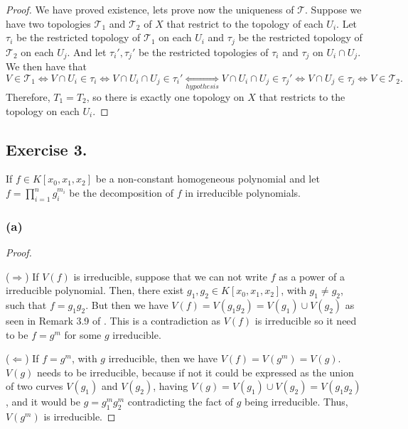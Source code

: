 \documentclass[11pt,a4paper]{article}
\begin{document}
\begin{proof}
  \vspace{1mm}
  We have proved existence, lets prove now the uniqueness of $ \mathcal T $. Suppose we have two topologies $ \mathcal T_1 $ and $ \mathcal T_2 $ of $ X $ that restrict to the topology of each $ U_i $. Let $ \tau_i $ be the restricted topology of $ \mathcal T_1 $ on each $ U_i $ and $ \tau_j $ be the restricted topology of $ \mathcal T_2 $ on each $ U_j $. And let $ \tau_i', \tau_j' $ be the restricted topologies of $ \tau_i $ and $ \tau_j $ on $ U_i \cap U_j $. We then have that 
  $$
    V \in \mathcal T_1 \Leftrightarrow V \cap U_i \in \tau_i \Leftrightarrow V \cap U_i \cap U_j \in \tau_i' \underset{hypothesis}{\Leftrightarrow} V \cap U_i \cap U_j \in \tau_j' \Leftrightarrow  V \cap U_j \in \tau_j \Leftrightarrow V \in \mathcal T_2.
  $$
  Therefore, $ T_1 = T_2 $, so there is exactly one topology on $ X $ that restricts to the topology on each $ U_i $.
\end{proof}

\subsection*{Exercise 3.}

  If $ f \in K[x_0, x_1, x_2] $ be a non-constant homogeneous polynomial and let $ f = \prod_{i=1}^n g_i^{m_i} $ be the decomposition of $ f $ in irreducible polynomials.

\subsubsection*{(a)}
  \begin{proof} \

    \vspace{1mm}
    ($\Rightarrow$)
    If $ V(f) $ is irreducible, suppose that we can not write $ f $ as a power of a irreducible polynomial. Then, there exist $ g_1, g_2 \in K[x_0, x_1, x_2] $, with $ g_1 \neq g_2 $, such that $ f = g_1 g_2 $. But then we have $ V(f) = V(g_1 g_2) = V(g_1) \cup V(g_2) $ as seen in Remark 3.9 of \cite{gath}. This is a contradiction as $ V(f) $ is irreducible so it need to be $ f = g^m $ for some $g$ irreducible.

    \vspace{1mm}
    ($\Leftarrow$)
    If $ f = g^m $, with $ g $ irreducible, then we have $ V(f) = V(g^m) = V(g) $. $ V(g) $ needs to be irreducible, because if not it could be expressed as the union of two curves $ V(g_1) $ and $ V(g_2) $, having $ V(g) = V(g_1) \cup V(g_2) = V(g_1 g_2) $, and it would be $ g =  g_1^m g_2^m $ contradicting the fact of $ g $ being irreducible. Thus, $ V(g^m) $ is irreducible.
  \end{proof}
\end{document}
